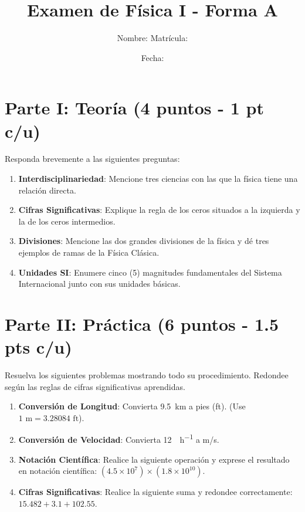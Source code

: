 \documentclass[a4paper,12pt]{article}
\title{Examen de Física I - Forma A}
\author{Nombre: \underline{\hspace{8cm}} \quad Matrícula: \underline{\hspace{3cm}}}
\date{Fecha: \underline{\hspace{4cm}}}
\begin{document}
\maketitle

\section{Parte I: Teoría (4 puntos - 1 pt c/u)}
Responda brevemente a las siguientes preguntas:

\begin{enumerate}[itemsep=2em]
    \item \textbf{Interdisciplinariedad}: Mencione tres ciencias con las que la física tiene una relación directa.
    \item \textbf{Cifras Significativas}: Explique la regla de los ceros situados a la izquierda y la de los ceros intermedios.
    \item \textbf{Divisiones}: Mencione las dos grandes divisiones de la física y dé tres ejemplos de ramas de la Física Clásica.
    \item \textbf{Unidades SI}: Enumere cinco (5) magnitudes fundamentales del Sistema Internacional junto con sus unidades básicas.
\end{enumerate}

\vspace{2cm}

\section{Parte II: Práctica (6 puntos - 1.5 pts c/u)}
Resuelva los siguientes problemas mostrando todo su procedimiento. Redondee según las reglas de cifras significativas aprendidas.

\begin{enumerate}[itemsep=4em]
    \item \textbf{Conversión de Longitud}: Convierta \SI{9.5}{\km} a pies (ft). (Use $1\text{ m} = 3.28084\text{ ft}$).
    \item \textbf{Conversión de Velocidad}: Convierta \SI{12}{\mile\per\hour} a \si[per-mode=symbol]{\metre\per\second}.
    \item \textbf{Notación Científica}: Realice la siguiente operación y exprese el resultado en notación científica: $(4.5 \times 10^7) \times (1.8 \times 10^{10})$.
    \item \textbf{Cifras Significativas}: Realice la siguiente suma y redondee correctamente: $15.482 + 3.1 + 102.55$.
\end{enumerate}
\end{document}
